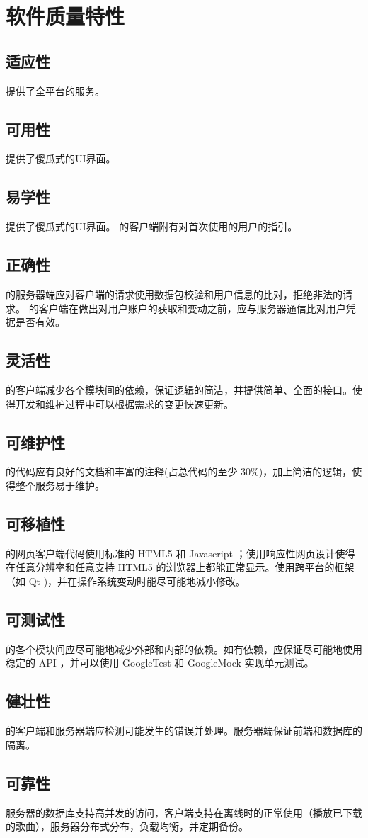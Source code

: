 \chapter{软件质量特性}

\section {适应性}
\proname 提供了全平台的服务。

\section {可用性}
\proname 提供了傻瓜式的UI界面。

\section {易学性}
\proname 提供了傻瓜式的UI界面。 \proname 的客户端附有对首次使用的用户的指引。

\section {正确性}
\proname 的服务器端应对客户端的请求使用数据包校验和用户信息的比对，拒绝非法的请求。
\proname 的客户端在做出对用户账户的获取和变动之前，应与服务器通信比对用户凭据是否有效。

\section {灵活性}
\proname 的客户端减少各个模块间的依赖，保证逻辑的简洁，并提供简单、全面的接口。使得开发和维护过程中可以根据需求的变更快速更新。

\section {可维护性}
\proname 的代码应有良好的文档和丰富的注释(占总代码的至少 30\%)，加上简洁的逻辑，使得整个服务易于维护。

\section {可移植性}
\proname 的网页客户端代码使用标准的 HTML5 和 Javascript  ；使用响应性网页设计使得在任意分辨率和任意支持 HTML5 的浏览器上都能正常显示。使用跨平台的框架（如 Qt )，并在操作系统变动时能尽可能地减小修改。

\section {可测试性}
\proname 的各个模块间应尽可能地减少外部和内部的依赖。如有依赖，应保证尽可能地使用稳定的 API ，并可以使用 GoogleTest 和 GoogleMock 实现单元测试。

\section {健壮性}
\proname 的客户端和服务器端应检测可能发生的错误并处理。服务器端保证前端和数据库的隔离。

\section {可靠性}
\proname 服务器的数据库支持高并发的访问，客户端支持在离线时的正常使用（播放已下载的歌曲），服务器分布式分布，负载均衡，并定期备份。


